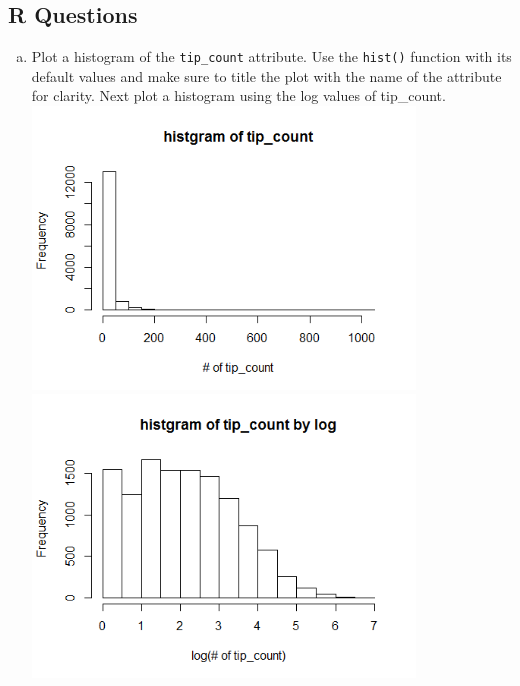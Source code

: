 \documentclass[11pt]{article}
\begin{document}
\subsection*{R Questions}
\begin{enumerate}[(a)]
\item 
Plot a histogram of the \texttt{tip\_count} attribute. Use the \texttt{hist()} function with its default values and make sure to title the plot with the name of the attribute for clarity. Next plot a histogram using the log values of tip\_count.\\

\includegraphics[width=4in]{tip_count.png}\\
\includegraphics[width=4in]{tip_count_log.png}


\end{enumerate}
\end{document}
